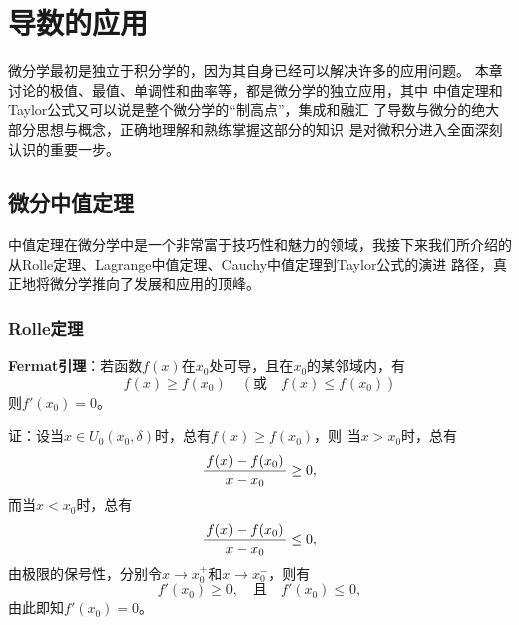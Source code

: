 
\setcounter{chapter}{2}

\chapter{导数的应用}

微分学最初是独立于积分学的，因为其自身已经可以解决许多的应用问题。
本章讨论的极值、最值、单调性和曲率等，都是微分学的独立应用，其中
中值定理和Taylor公式又可以说是整个微分学的“制高点”，集成和融汇
了导数与微分的绝大部分思想与概念，正确地理解和熟练掌握这部分的知识
是对微积分进入全面深刻认识的重要一步。

\section{微分中值定理}

中值定理在微分学中是一个非常富于技巧性和魅力的领域，我接下来我们所介绍的
从Rolle定理、Lagrange中值定理、Cauchy中值定理到Taylor公式的演进
路径，真正地将微分学推向了发展和应用的顶峰。

\subsection{Rolle定理}

\begin{thx}
	{\bf Fermat引理}：若函数$f(x)$在$x_0$处可导，且在$x_0$的某邻域内，有
	$$f(x)\geq f(x_0)\quad (\mbox{或}\quad f(x)\leq f(x_0))$$
	则$f'(x_0)=0$。
\end{thx}

证：设当$x\in U_0(x_0,\delta)$时，总有$f(x)\geq f(x_0)$，则
当$x>x_0$时，总有
$$\displaystyle\frac{\,{f(x)-f(x_0)}\,}{\,{x-x_0}\,}\geq 0,$$
而当$x<x_0$时，总有
$$\displaystyle\frac{\,{f(x)-f(x_0)}\,}{\,{x-x_0}\,}\leq 0,$$
由极限的保号性，分别令$x\to x_0^+$和$x\to x_0^-$，则有
$$f'(x_0)\geq 0,\quad\mbox{且}\quad f'(x_0)\leq 0,$$
由此即知$f'(x_0)=0$。\fin

